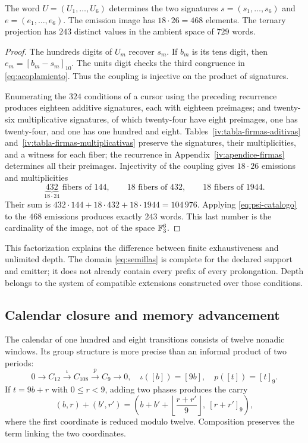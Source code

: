 \begin{proposition}
The word \(U=(U_1,\ldots,U_6)\) determines the two signatures \(s=(s_1,\ldots,s_6)\) and \(e=(e_1,\ldots,e_6)\). The emission image has \(18\cdot26=468\) elements. The ternary projection has \(243\) distinct values in the ambient space of \(729\) words.
\end{proposition}
\begin{proof}
The hundreds digits of \(U_m\) recover \(s_m\). If \(b_m\) is its tens digit, then \(e_m=[b_m-s_m]_{10}\). The units digit checks the third congruence in \eqref{eq:acoplamiento}. Thus the coupling is injective on the product of signatures.

Enumerating the \(324\) conditions of a cursor using the preceding recurrence produces eighteen additive signatures, each with eighteen preimages; and twenty-six multiplicative signatures, of which twenty-four have eight preimages, one has twenty-four, and one has one hundred and eight. Tables~\ref{iv:tabla-firmas-aditivas}
and~\ref{iv:tabla-firmas-multiplicativas} preserve the signatures,
their multiplicities, and a witness for each fiber; the recurrence in
Appendix~\ref{iv:apendice-firmas} determines all their preimages. Injectivity of the coupling gives \(18\cdot26\) emissions and multiplicities
\[
 \underbrace{432}_{18\cdot24}\text{ fibers of }144,
 \qquad18\text{ fibers of }432,
 \qquad18\text{ fibers of }1944.
\]
Their sum is \(432\cdot144+18\cdot432+18\cdot1944=104\,976\). Applying \eqref{eq:psi-catalogo} to the \(468\) emissions produces exactly \(243\) words. This last number is the cardinality of the image, not of the space \(\mathbb F_3^6\).
\end{proof}

This factorization explains the difference between finite exhaustiveness and unlimited depth. The domain \eqref{eq:semillas} is complete for the declared support and emitter; it does not already contain every prefix of every prolongation. Depth belongs to the system of compatible extensions constructed over those conditions.

\subsection{Calendar closure and memory advancement}

The calendar of one hundred and eight transitions consists of twelve nonadic windows. Its group structure is more precise than an informal product of two periods:
\begin{equation}
 0\longrightarrow C_{12}\xrightarrow{\iota}C_{108}
 \xrightarrow{p}C_9\longrightarrow0,
 \quad\iota([b])=[9b],\quad p([t])=[t]_9.
 \label{eq:extension108}
\end{equation}
If \(t=9b+r\) with \(0\le r<9\), adding two phases produces the carry
\[
 (b,r)+(b',r')=
 \left(b+b'+\left\lfloor\frac{r+r'}9\right\rfloor,\ [r+r']_9\right),
\]
where the first coordinate is reduced modulo twelve. Composition preserves the term linking the two coordinates.

